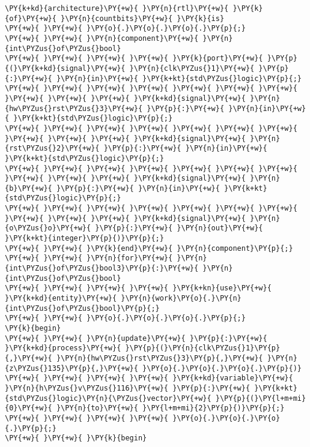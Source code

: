 \begin{Verbatim}[commandchars=\\\{\}]
\PY{k+kd}{architecture}\PY{+w}{ }\PY{n}{rtl}\PY{+w}{ }\PY{k}{of}\PY{+w}{ }\PY{n}{countbits}\PY{+w}{ }\PY{k}{is}
\PY{+w}{ }\PY{+w}{ }\PY{o}{.}\PY{o}{.}\PY{o}{.}\PY{p}{;}
\PY{+w}{ }\PY{+w}{ }\PY{n}{component}\PY{+w}{ }\PY{n}{int\PYZus{}of\PYZus{}bool}
\PY{+w}{ }\PY{+w}{ }\PY{+w}{ }\PY{+w}{ }\PY{k}{port}\PY{+w}{ }\PY{p}{(}\PY{k+kd}{signal}\PY{+w}{ }\PY{n}{clk\PYZus{}1}\PY{+w}{ }\PY{p}{:}\PY{+w}{ }\PY{n}{in}\PY{+w}{ }\PY{k+kt}{std\PYZus{}logic}\PY{p}{;}
\PY{+w}{ }\PY{+w}{ }\PY{+w}{ }\PY{+w}{ }\PY{+w}{ }\PY{+w}{ }\PY{+w}{ }\PY{+w}{ }\PY{+w}{ }\PY{+w}{ }\PY{k+kd}{signal}\PY{+w}{ }\PY{n}{hw\PYZus{}rst\PYZus{}3}\PY{+w}{ }\PY{p}{:}\PY{+w}{ }\PY{n}{in}\PY{+w}{ }\PY{k+kt}{std\PYZus{}logic}\PY{p}{;}
\PY{+w}{ }\PY{+w}{ }\PY{+w}{ }\PY{+w}{ }\PY{+w}{ }\PY{+w}{ }\PY{+w}{ }\PY{+w}{ }\PY{+w}{ }\PY{+w}{ }\PY{k+kd}{signal}\PY{+w}{ }\PY{n}{rst\PYZus{}2}\PY{+w}{ }\PY{p}{:}\PY{+w}{ }\PY{n}{in}\PY{+w}{ }\PY{k+kt}{std\PYZus{}logic}\PY{p}{;}
\PY{+w}{ }\PY{+w}{ }\PY{+w}{ }\PY{+w}{ }\PY{+w}{ }\PY{+w}{ }\PY{+w}{ }\PY{+w}{ }\PY{+w}{ }\PY{+w}{ }\PY{k+kd}{signal}\PY{+w}{ }\PY{n}{b}\PY{+w}{ }\PY{p}{:}\PY{+w}{ }\PY{n}{in}\PY{+w}{ }\PY{k+kt}{std\PYZus{}logic}\PY{p}{;}
\PY{+w}{ }\PY{+w}{ }\PY{+w}{ }\PY{+w}{ }\PY{+w}{ }\PY{+w}{ }\PY{+w}{ }\PY{+w}{ }\PY{+w}{ }\PY{+w}{ }\PY{k+kd}{signal}\PY{+w}{ }\PY{n}{o\PYZus{}o}\PY{+w}{ }\PY{p}{:}\PY{+w}{ }\PY{n}{out}\PY{+w}{ }\PY{k+kt}{integer}\PY{p}{)}\PY{p}{;}
\PY{+w}{ }\PY{+w}{ }\PY{k}{end}\PY{+w}{ }\PY{n}{component}\PY{p}{;}
\PY{+w}{ }\PY{+w}{ }\PY{n}{for}\PY{+w}{ }\PY{n}{int\PYZus{}of\PYZus{}bool3}\PY{p}{:}\PY{+w}{ }\PY{n}{int\PYZus{}of\PYZus{}bool}
\PY{+w}{ }\PY{+w}{ }\PY{+w}{ }\PY{+w}{ }\PY{k+kn}{use}\PY{+w}{ }\PY{k+kd}{entity}\PY{+w}{ }\PY{n}{work}\PY{o}{.}\PY{n}{int\PYZus{}of\PYZus{}bool}\PY{p}{;}
\PY{+w}{ }\PY{+w}{ }\PY{o}{.}\PY{o}{.}\PY{o}{.}\PY{p}{;}
\PY{k}{begin}
\PY{+w}{ }\PY{+w}{ }\PY{n}{update}\PY{+w}{ }\PY{p}{:}\PY{+w}{ }\PY{k+kd}{process}\PY{+w}{ }\PY{p}{(}\PY{n}{clk\PYZus{}1}\PY{p}{,}\PY{+w}{ }\PY{n}{hw\PYZus{}rst\PYZus{}3}\PY{p}{,}\PY{+w}{ }\PY{n}{z\PYZus{}135}\PY{p}{,}\PY{+w}{ }\PY{o}{.}\PY{o}{.}\PY{o}{.}\PY{p}{)}
\PY{+w}{ }\PY{+w}{ }\PY{+w}{ }\PY{+w}{ }\PY{k+kd}{variable}\PY{+w}{ }\PY{n}{h\PYZus{}v\PYZus{}116}\PY{+w}{ }\PY{p}{:}\PY{+w}{ }\PY{k+kt}{std\PYZus{}logic}\PY{n}{\PYZus{}vector}\PY{+w}{ }\PY{p}{(}\PY{l+m+mi}{0}\PY{+w}{ }\PY{n}{to}\PY{+w}{ }\PY{l+m+mi}{2}\PY{p}{)}\PY{p}{;}
\PY{+w}{ }\PY{+w}{ }\PY{+w}{ }\PY{+w}{ }\PY{o}{.}\PY{o}{.}\PY{o}{.}\PY{p}{;}
\PY{+w}{ }\PY{+w}{ }\PY{k}{begin}
\end{Verbatim}
